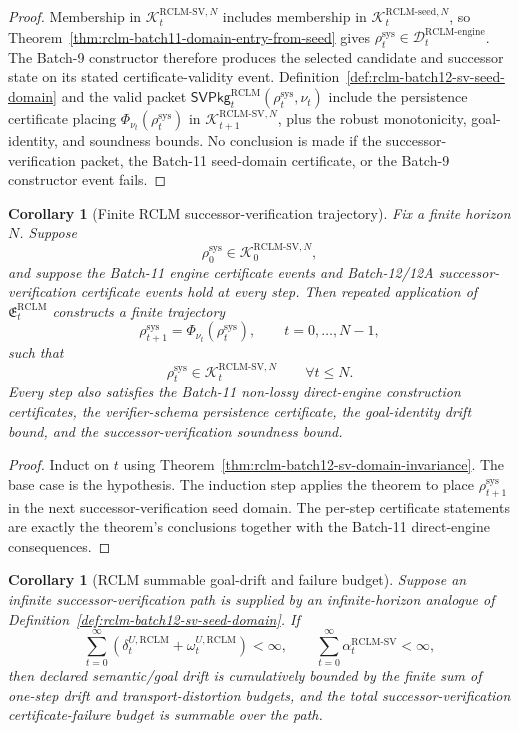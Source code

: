 \documentclass[11pt,a4paper]{article}
\newtheorem{corollary}[theorem]{Corollary}
\newcommand{\Kcal}{\mathcal K}
\newcommand{\Dcal}{\mathcal D}
\newcommand{\RCLM}{\mathrm{RCLM}}
\newcommand{\sys}{\mathrm{sys}}
\newcommand{\engine}{\mathrm{engine}}
\begin{document}
\begin{proof}
Membership in \(\Kcal_t^{\RCLM\text{-}\mathrm{SV},N}\) includes membership in \(\Kcal_t^{\RCLM\text{-}\mathrm{seed},N}\), so Theorem~\ref{thm:rclm-batch11-domain-entry-from-seed} gives \(\rho_t^{\sys}\in\Dcal_t^{\RCLM\text{-}\engine}\). The Batch-9 constructor therefore produces the selected candidate and successor state on its stated certificate-validity event. Definition~\ref{def:rclm-batch12-sv-seed-domain} and the valid packet \(\mathsf{SVPkg}_t^{\RCLM}(\rho_t^{\sys},\nu_t)\) include the persistence certificate placing \(\Phi_{\nu_t}(\rho_t^{\sys})\) in \(\Kcal_{t+1}^{\RCLM\text{-}\mathrm{SV},N}\), plus the robust monotonicity, goal-identity, and soundness bounds. No conclusion is made if the successor-verification packet, the Batch-11 seed-domain certificate, or the Batch-9 constructor event fails.
\end{proof}

\begin{corollary}[Finite RCLM successor-verification trajectory]
\label{cor:rclm-batch12-finite-sv-trajectory}
Fix a finite horizon \(N\). Suppose
\[
\rho_0^{\sys}\in\Kcal_0^{\RCLM\text{-}\mathrm{SV},N},
\]
and suppose the Batch-11 engine certificate events and Batch-12/12A successor-verification certificate events hold at every step. Then repeated application of \(\mathfrak E_t^{\RCLM}\) constructs a finite trajectory
\[
\rho_{t+1}^{\sys}=\Phi_{\nu_t}(\rho_t^{\sys}),
\qquad t=0,\ldots,N-1,
\]
such that
\[
\rho_t^{\sys}\in\Kcal_t^{\RCLM\text{-}\mathrm{SV},N}
\qquad\forall t\le N.
\]
Every step also satisfies the Batch-11 non-lossy direct-engine construction certificates, the verifier-schema persistence certificate, the goal-identity drift bound, and the successor-verification soundness bound.
\end{corollary}

\begin{proof}
Induct on \(t\) using Theorem~\ref{thm:rclm-batch12-sv-domain-invariance}. The base case is the hypothesis. The induction step applies the theorem to place \(\rho_{t+1}^{\sys}\) in the next successor-verification seed domain. The per-step certificate statements are exactly the theorem's conclusions together with the Batch-11 direct-engine consequences.
\end{proof}

\begin{corollary}[RCLM summable goal-drift and failure budget]
\label{cor:rclm-batch12-summable-drift-failure}
Suppose an infinite successor-verification path is supplied by an infinite-horizon analogue of Definition~\ref{def:rclm-batch12-sv-seed-domain}. If
\[
\sum_{t=0}^{\infty}(\delta_t^{U,\RCLM}+\omega_t^{U,\RCLM})<\infty,
\qquad
\sum_{t=0}^{\infty}\alpha_t^{\RCLM\text{-}\mathrm{SV}}<\infty,
\]
then declared semantic/goal drift is cumulatively bounded by the finite sum of one-step drift and transport-distortion budgets, and the total successor-verification certificate-failure budget is summable over the path.
\end{corollary}
\end{document}
